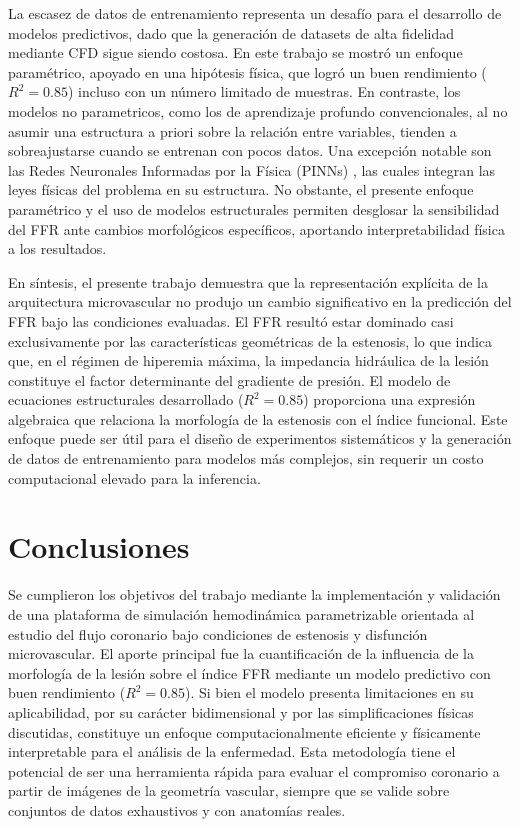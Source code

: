 \documentclass[12pt, letterpaper]{article}
\begin{document}
La escasez de datos de entrenamiento representa un desafío para el desarrollo de modelos predictivos, dado que la generación de datasets de alta fidelidad mediante CFD sigue siendo costosa. En este trabajo se mostró un enfoque paramétrico, apoyado en una hipótesis física, que logró un buen rendimiento ($R^2 = 0.85$) incluso con un número limitado de muestras. En contraste, los modelos no parametricos, como los de aprendizaje profundo convencionales, al no asumir una estructura a priori sobre la relación entre variables, tienden a sobreajustarse cuando se entrenan con pocos datos. Una excepción notable son las Redes Neuronales Informadas por la Física (PINNs) \cite{raissi_physics-informed_2019}, las cuales integran las leyes físicas del problema en su estructura. No obstante, el presente enfoque paramétrico y el uso de modelos estructurales permiten desglosar la sensibilidad del FFR ante cambios morfológicos específicos, aportando interpretabilidad física a los resultados.

En síntesis, el presente trabajo demuestra que la representación explícita de la arquitectura microvascular no produjo un cambio significativo en la predicción del FFR bajo las condiciones evaluadas. El FFR resultó estar dominado casi exclusivamente por las características geométricas de la estenosis, lo que indica que, en el régimen de hiperemia máxima, la impedancia hidráulica de la lesión constituye el factor determinante del gradiente de presión. El modelo de ecuaciones estructurales desarrollado ($R^2 = 0.85$) proporciona una expresión algebraica que relaciona la morfología de la estenosis con el índice funcional. Este enfoque puede ser útil para el diseño de experimentos sistemáticos y la generación de datos de entrenamiento para modelos más complejos, sin requerir un costo computacional elevado para la inferencia.

\section{Conclusiones}

Se cumplieron los objetivos del trabajo mediante la implementación y validación de una plataforma de simulación hemodinámica parametrizable orientada al estudio del flujo coronario bajo condiciones de estenosis y disfunción microvascular. El aporte principal fue la cuantificación de la influencia de la morfología de la lesión sobre el índice FFR mediante un modelo predictivo con buen rendimiento ($R^2 = 0.85$). Si bien el modelo presenta limitaciones en su aplicabilidad, por su carácter bidimensional y por las simplificaciones físicas discutidas, constituye un enfoque computacionalmente eficiente y físicamente interpretable para el análisis de la enfermedad. Esta metodología tiene el potencial de ser una herramienta rápida para evaluar el compromiso coronario a partir de imágenes de la geometría vascular, siempre que se valide sobre conjuntos de datos exhaustivos y con anatomías reales.
\end{document}

